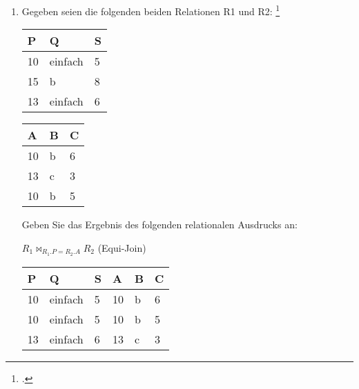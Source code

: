 \documentclass{lehramt-informatik-aufgabe}
\begin{document}

\begin{enumerate}


\item Gegeben seien die folgenden beiden Relationen R1 und R2:
\footcite{examen:66116:2021:03}


\begin{tabular}{|l|l|l|}
\hline
P  & Q       & S \\ \hline
10 & einfach & 5 \\ \hline
15 & b       & 8 \\ \hline
13 & einfach & 6 \\ \hline
\end{tabular}


\begin{tabular}{|l|l|l|}
\hline
A  & B & C \\ \hline
10 & b & 6 \\ \hline
13 & c & 3 \\ \hline
10 & b & 5 \\ \hline
\end{tabular}

Geben Sie das Ergebnis des folgenden relationalen Ausdrucks an:

\begin{center}
$R_1 \bowtie_ {R_1.P = R_2.A} R_2$ (Equi-Join)
\end{center}

\begin{liAntwort}
\begin{tabular}{|l|l|l|l|l|l|}
\hline
P  & Q       & S & A  & B & C \\ \hline
10 & einfach & 5 & 10 & b & 6 \\ \hline
10 & einfach & 5 & 10 & b & 5 \\ \hline
13 & einfach & 6 & 13 & c & 3 \\ \hline
\end{tabular}
\end{liAntwort}


\end{enumerate}
\end{document}

